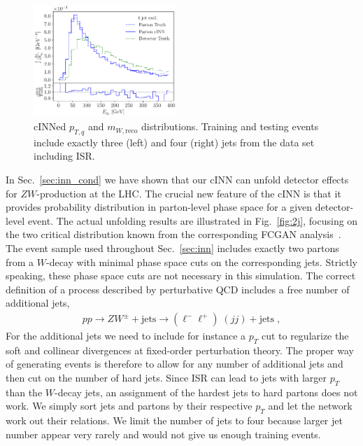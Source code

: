 \begin{figure}[t]
\includegraphics[page =19, width=0.48\textwidth]{figures/cINN/isr_4jonly_test_ratio}
\caption{cINNed $p_{T,q}$ and $m_{W,\text{reco}}$ distributions.  Training and
  testing events include exactly three (left) and four (right) jets
  from the data set including ISR.}
\label{fig:34j}
\end{figure}

In Sec.~\ref{sec:inn_cond} we have shown that our cINN can unfold
detector effects for $ZW$-production at the LHC.  The crucial new
feature of the cINN is that it provides probability distribution in
parton-level phase space for a given detector-level event. The actual
unfolding results are illustrated in Fig.~\ref{fig:2j}, focusing on
the two critical distribution known from the corresponding FCGAN
analysis~\cite{fcgan}.  The event sample used throughout
Sec.~\ref{sec:inn} includes exactly two partons from a $W$-decay with
minimal phase space cuts on the corresponding jets. Strictly speaking,
these phase space cuts are not necessary in this simulation. The
correct definition of a process described by perturbative QCD includes
a free number of additional jets,
%
\begin{align}
pp
\to ZW^\pm + \text{jets}
\to (\ell^- \ell^+) \; (j j ) + \text{jets} \; ,
\label{eq:proc_jets}
\end{align}
%
For the additional jets we need to include for instance a $p_T$ cut to
regularize the soft and collinear divergences at fixed-order
perturbation theory. The proper way of generating events is therefore
to allow for any number of additional jets and then cut on the number
of hard jets.  Since ISR can lead to jets with larger $p_T$ than the
$W$-decay jets, an assignment of the hardest jets to hard partons does
not work. We simply sort jets and partons by their respective $p_T$
and let the network work out their relations.  We limit the number of
jets to four because larger jet number appear very rarely and would
not give us enough training events.

